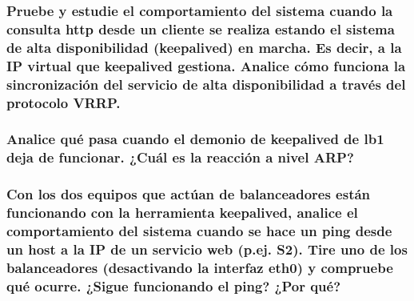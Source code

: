 \documentclass[12pt]{article}
\begin{document}
    \subsubsection{Pruebe y estudie el comportamiento del sistema cuando la consulta http desde un cliente se realiza estando el sistema de alta disponibilidad (keepalived) en marcha. Es decir, a la IP virtual que keepalived gestiona. Analice cómo funciona la sincronización del servicio de alta disponibilidad a través del protocolo VRRP.}

    \subsubsection{Analice qué pasa cuando el demonio de keepalived de lb1 deja de funcionar. ¿Cuál es la reacción a nivel ARP?}
    
    \subsubsection{Con los dos equipos que actúan de balanceadores están funcionando con la herramienta keepalived, analice el comportamiento del sistema cuando se hace un ping desde un host a la IP de un servicio web (p.ej. S2). Tire uno de los balanceadores (desactivando la interfaz eth0) y compruebe qué ocurre. ¿Sigue funcionando el ping? ¿Por qué?}
    
    \subsubsection{}
\end{document}
